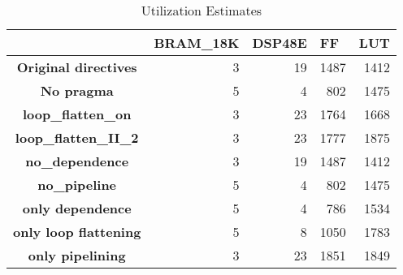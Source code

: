 



\begin{table}[htbp]
\begin{center}
\begin{tabular}{|c|r|r|r|r|}
\hline
 & \multicolumn{1}{l|}{\textbf{BRAM\_18K}} & \multicolumn{1}{l|}{\textbf{DSP48E}} & \multicolumn{1}{l|}{\textbf{FF}} & \multicolumn{1}{l|}{\textbf{LUT}} \\ \hline
\textbf{Original directives} & 3 & 19 & 1487 & 1412 \\ \hline
\textbf{No pragma} & 5 & 4 & 802 & 1475 \\ \hline
\textbf{loop\_flatten\_on} & 3 & 23 & 1764 & 1668 \\ \hline
\textbf{loop\_flatten\_II\_2} & 3 & 23 & 1777 & 1875 \\ \hline
\textbf{no\_dependence} & 3 & 19 & 1487 & 1412 \\ \hline
\textbf{no\_pipeline} & 5 & 4 & 802 & 1475 \\ \hline
\textbf{only dependence} & 5 & 4 & 786 & 1534 \\ \hline
\textbf{only loop flattening} & 5 & 8 & 1050 & 1783 \\ \hline
\textbf{only pipelining} & 3 & 23 & 1851 & 1849 \\ \hline
\end{tabular}
\end{center}
\caption{Utilization Estimates}
\label{tab:utilization_estimates}
\end{table}


